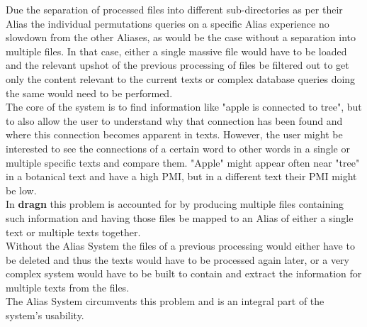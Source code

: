 Due the separation of processed files into different sub-directories as per their Alias the individual permutations queries on a specific Alias experience no slowdown from the other Aliases, as would be the case without a separation into multiple files. In that case, either a single massive file would have to be loaded and the relevant upshot of the previous processing of files be filtered out to get only the content relevant to the current texts or complex database queries doing the same would need to be performed.\\
The core of the system is to find information like "apple is connected to tree", but to also allow the user to understand why that connection has been found and where this connection becomes apparent in texts. However, the user might be interested to see the connections of a certain word to other words in a single or multiple specific texts and compare them. "Apple" might appear often near "tree" in a botanical text and have a high PMI, but in a different text their PMI might be low.\\
In \textbf{dragn} this problem is accounted for by producing multiple files containing such information and having those files be mapped to an Alias of either a single text or multiple texts together.\\
Without the Alias System the files of a previous processing would either have to be deleted and thus the texts would have to be processed again later, or a very complex system would have to be built to contain and extract the information for multiple texts from the files.\\
The Alias System circumvents this problem and is an integral part of the system's usability.
